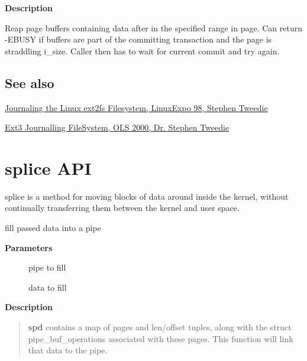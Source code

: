 \documentclass[a4paper,8pt,english]{sphinxmanual}
\begin{document}
\textbf{Description}

Reap page buffers containing data after in the specified range in page.
Can return -EBUSY if buffers are part of the committing transaction and
the page is straddling i\_size. Caller then has to wait for current commit
and try again.


\section{See also}
\label{filesystems/index:see-also}
\href{http://kernel.org/pub/linux/kernel/people/sct/ext3/journal-design.ps.gz}{Journaling the Linux ext2fs Filesystem, LinuxExpo 98, Stephen
Tweedie}

\href{http://olstrans.sourceforge.net/release/OLS2000-ext3/OLS2000-ext3.html}{Ext3 Journalling FileSystem, OLS 2000, Dr. Stephen
Tweedie}


\chapter{splice API}
\label{filesystems/index:splice-api}
splice is a method for moving blocks of data around inside the kernel,
without continually transferring them between the kernel and user space.

\begin{fulllineitems}
\label{filesystems/index:c.splice_to_pipe}
fill passed data into a pipe

\end{fulllineitems}


\textbf{Parameters}
\begin{description}
\item[{}] \leavevmode
pipe to fill

\item[{}] \leavevmode
data to fill

\end{description}

\textbf{Description}
\begin{quote}

\textbf{spd} contains a map of pages and len/offset tuples, along with
the struct pipe\_buf\_operations associated with these pages. This
function will link that data to the pipe.
\end{quote}
\end{document}
